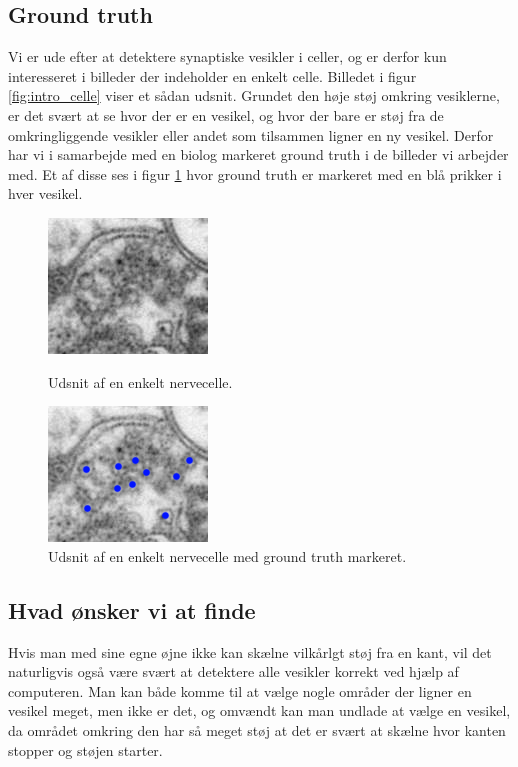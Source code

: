 \subsection{Ground truth}				
Vi er ude efter at detektere synaptiske vesikler i celler, og er derfor kun interesseret i billeder der indeholder en enkelt celle. Billedet i figur \ref{fig:intro_celle} viser et sådan udsnit. Grundet den høje støj omkring vesiklerne, er det svært at se hvor der er en vesikel, og hvor der bare er støj fra de omkringliggende vesikler eller andet som tilsammen ligner en ny vesikel. Derfor har vi i samarbejde med en biolog markeret ground truth i de billeder vi arbejder med. Et af disse ses i figur \ref{fig:intro_celle_groundtruth} hvor ground truth er markeret med en blå prikker i hver vesikel.

\begin{figure}[H]
	\begin{minipage}[b]{0.5\linewidth}
		\centering
		\includegraphics[scale=1.5]{files/intro/img/celle.png}
	\caption{Udsnit af en enkelt nervecelle.\label{fig:intro_celle}}
	\end{minipage}
	\hspace{0.5cm}
	\begin{minipage}[b]{0.5\linewidth}
		\centering
		\includegraphics[scale=1.5]{files/intro/img/celle_groundtruth.png}
		\caption{Udsnit af en enkelt nervecelle med ground truth markeret.\label{fig:intro_celle_groundtruth}}
	\end{minipage}
\end{figure}
  

\subsection{Hvad ønsker vi at finde}
Hvis man med sine egne øjne ikke kan skælne vilkårlgt støj fra en kant, vil det naturligvis også være svært at detektere alle vesikler korrekt ved hjælp af computeren. Man kan både komme til at vælge nogle områder der ligner en vesikel meget, men ikke er det, og omvændt kan man undlade at vælge en vesikel, da området omkring den har så meget støj at det er svært at skælne hvor kanten stopper og støjen starter. 

